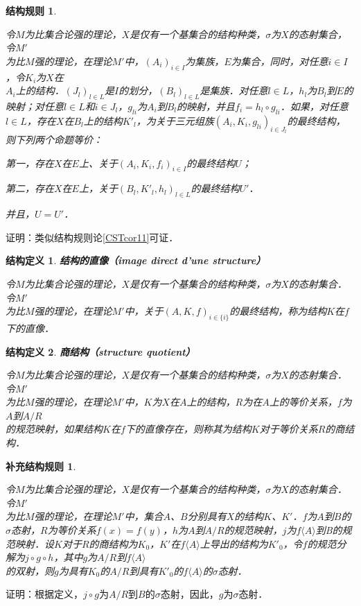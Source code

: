\documentclass[12pt, a4paper, oneside]{book}
\newtheorem{STdef}{结构定义}
\newtheorem{CST}{结构规则}
\newtheorem{CSTcor}{补充结构规则}
\begin{document}
			\begin{CST}\label{CST19}
				\hfill\par
				令$M$为比集合论强的理论，$X$是仅有一个基集合的结构种类，$\sigma$为$X$的态射集合，令$M'$\\为比$M$强的理论，在理论$M'$中，$(A_i)_{i\in I}$为集族，$E$为集合，同时，对任意$i\in I$，令$K_i$为$X$在\\$A_i$上的结构．$(J_l)_{l\in L}$是$I$的划分，$(B_l)_{l\in L}$是集族．对任意$l\in L$，$h_l$为$B_l$到$E$的映射；对任意$l\in L$和$i\in J_l$，$g_{li}$为$A_i$到$B_l$的映射，并且$f_i=h_l\circ g_{li}$．如果，对任意$l\in L$，存在$X$在$B_l$上的结构${K'}_l$，为关于三元组族$(A_i, K_i, g_{li})_{i\in J_l}$的最终结构，则下列两个命题等价：
				\par
				第一，存在$X$在$E$上、关于$(A_i, K_i, f_i)_{i\in I}$的最终结构$U$；
				\par
				第二，存在$X$在$E$上，关于$(B_l, {K'}_l, h_l)_{l\in L}$的最终结构$U'$．
				\par
				并且，$U=U'$．
			\end{CST}
			证明：类似结构规则论\ref{CSTcor11}可证．
						
			\begin{STdef}
				\textbf{结构的直像（image direct d'une structure）}
				\par
				令$M$为比集合论强的理论，$X$是仅有一个基集合的结构种类，$\sigma$为$X$的态射集合．令$M'$\\为比$M$强的理论，在理论$M'$中，关于$(A, K, f)_{i\in \{i\}}$的最终结构，称为结构$K$在$f$下的直像．
			\end{STdef}
			
			\begin{STdef}
				\textbf{商结构（structure quotient）}
				\par
				令$M$为比集合论强的理论，$X$是仅有一个基集合的结构种类，$\sigma$为$X$的态射集合．令$M'$\\为比$M$强的理论，在理论$M'$中，$K$为$X$在$A$上的结构，$R$为在$A$上的等价关系，$f$为$A$到$A/R$\\的规范映射，如果结构$K$在$f$下的直像存在，则称其为结构$K$对于等价关系$R$的商结构．
			\end{STdef}
			
			\begin{CSTcor}\label{CSTcor13}
				\hfill\par
				令$M$为比集合论强的理论，$X$是仅有一个基集合的结构种类，$\sigma$为$X$的态射集合．令$M'$\\为比$M$强的理论，在理论$M'$中，集合$A$、$B$分别具有$X$的结构$K$、$K'$．$f$为$A$到$B$的$\sigma$态射，$R$为等价关系$f(x)=f(y)$，$h$为$A$到$A/R$的规范映射，$j$为$f\langle A\rangle $到B的规范映射．设$K$对于$R$的商结构为$K_0$，$K'$在$f\langle A\rangle$上导出的结构为${K'}_0$，令$f$的规范分解为$j\circ g\circ h$，其中$g$为$A/R$到$f\langle A\rangle$\\的双射，则$g$为具有$K_0$的$A/R$到具有${K'}_0$的$f\langle A\rangle$的$\sigma$态射．
			\end{CSTcor}
			证明：根据定义，$j\circ g$为$A/R$到$B$的$\sigma$态射，因此，$g$为$\sigma$态射．
			
\end{document}
